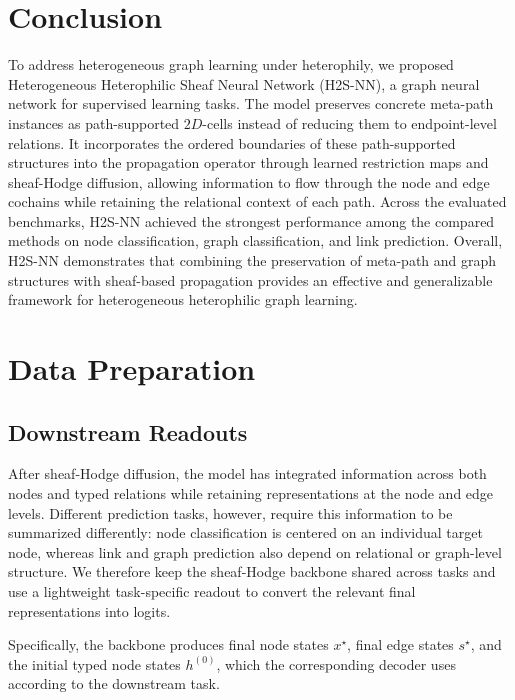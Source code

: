 \documentclass[sigconf,anonymous,review]{acmart}
\newcommand{\method}{\textsc{H2S-NN}}
\begin{document}
\section{Conclusion}
To address heterogeneous graph learning under heterophily, we proposed Heterogeneous Heterophilic Sheaf Neural Network (\method{}), a graph neural network for supervised learning tasks. The model preserves concrete meta-path instances as path-supported \(2D\)-cells instead of reducing them to endpoint-level relations. It incorporates the ordered boundaries of these path-supported structures into the propagation operator through learned restriction maps and sheaf-Hodge diffusion, allowing information to flow through the node and edge cochains while retaining the relational context of each path. Across the evaluated benchmarks, \method{} achieved the strongest performance among the compared methods on node classification, graph classification, and link prediction. Overall, \method{} demonstrates that combining the preservation of meta-path and graph structures with sheaf-based propagation provides an effective and generalizable framework for heterogeneous heterophilic graph learning.




\appendix

\section{Data Preparation}
\label{sec:data-prep}

\subsection{Downstream Readouts}
\label{sec:readouts}

After sheaf-Hodge diffusion, the model has integrated information across both nodes and
typed relations while retaining representations at the node and edge levels.  Different
prediction tasks, however, require this information to be summarized differently: node
classification is centered on an individual target node, whereas link and graph prediction
also depend on relational or graph-level structure.  We therefore keep the sheaf-Hodge
backbone shared across tasks and use a lightweight task-specific readout to convert the
relevant final representations into logits.

Specifically, the backbone produces final node states \(x^\star\), final edge states
\(s^\star\), and the initial typed node states \(h^{(0)}\), which the corresponding decoder
uses according to the downstream task.
\end{document}

